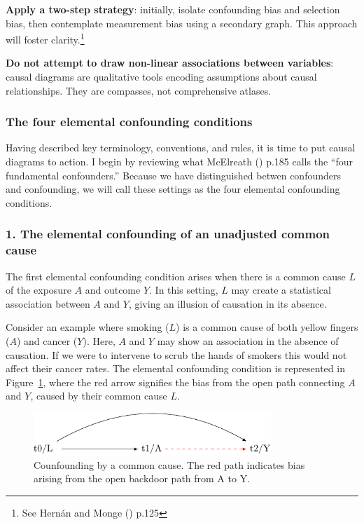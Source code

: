\documentclass[
  singlecolumn,
  9pt]{article}
\begin{document}
\textbf{Apply a two-step strategy}: initially, isolate confounding bias
and selection bias, then contemplate measurement bias using a secondary
graph. This approach will foster clarity.\footnote{See Hernán and Monge
  () p.125}

\textbf{Do not attempt to draw non-linear associations between
variables}: causal diagrams are qualitative tools encoding assumptions
about causal relationships. They are compasses, not comprehensive
atlases.

\subsubsection{The four elemental confounding
conditions}\label{the-four-elemental-confounding-conditions}

Having described key terminology, conventions, and rules, it is time to
put causal diagrams to action. I begin by reviewing what McElreath
() p.185 calls the ``four fundamental
confounders.'' Because we have distinguished betwen confounders and
confounding, we will call these settings as the four elemental
confounding conditions.

\subsubsection{1. The elemental confounding of an unadjusted common
cause}\label{the-elemental-confounding-of-an-unadjusted-common-cause}

The first elemental confounding condition arises when there is a common
cause \(L\) of the exposure \(A\) and outcome \(Y\). In this setting,
\(L\) may create a statistical association between \(A\) and \(Y\),
giving an illusion of causation in its absence.

Consider an example where smoking (\(L\)) is a common cause of both
yellow fingers (\(A\)) and cancer (\(Y\)). Here, \(A\) and \(Y\) may
show an association in the absence of causation. If we were to intervene
to scrub the hands of smokers this would not affect their cancer rates.
The elemental confounding condition is represented in
Figure~\ref{fig-dag-common-cause}, where the red arrow signifies the
bias from the open path connecting \(A\) and \(Y\), caused by their
common cause \(L\).

\begin{figure}

{\centering \includegraphics[width=0.8\textwidth,height=\textheight]{causal-dags_files/figure-pdf/fig-dag-common-cause-1.pdf}

}

\caption{\label{fig-dag-common-cause}Counfounding by a common cause. The
red path indicates bias arising from the open backdoor path from A to
Y.}

\end{figure}
\end{document}
